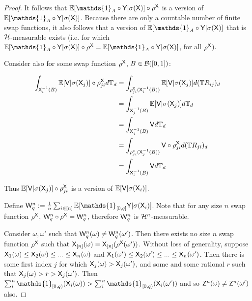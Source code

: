 \begin{proof}
It follows that $\mathbb{E}[\mathds{1}_A\circ\RV{Y}|\sigma(\RV{X})] \circ\rho^{\RV{X}}$ is a version of $\mathbb{E}[\mathds{1}_A\circ\RV{Y}|\sigma(\RV{X})]$. Because there are only a countable number of finite swap functions, it also follows that a version of $\mathbb{E}[\mathds{1}_A\circ\RV{Y}|\sigma(\RV{X})]$ that is $\mathcal{H}$-measurable exists (i.e. for which $\mathbb{E}[\mathds{1}_A\circ\RV{Y}|\sigma(\RV{X})]\circ\rho^{\RV{X}} = \mathbb{E}[\mathds{1}_A\circ\RV{Y}|\sigma(\RV{X})]$, for all $\rho^{\mathsf{X}}$).

Consider also for some swap function $\rho^{\mathsf{X}}$, $B\in \mathcal{B}([0,1])$:

\begin{align}
    \int_{\mathsf{X}_i^{-1}(B)} \mathbb{E}[\mathsf{V}|\sigma(\mathsf{X}_j)] \circ \rho^{\mathsf{X}}_{ji} d\mathbb{T}_d &= \int_{\rho^{\mathsf{X}}_{ji}(\mathsf{X}_i^{-1}(B))} \mathbb{E}[\mathsf{V}|\sigma(\mathsf{X}_j)] d(\mathbb{T}R_{ij})_d\\
                                                                               &= \int_{\mathsf{X}^{-1}_{j}(B)} \mathbb{E}[\mathsf{V}|\sigma(\mathsf{X}_j)] d\mathbb{T}_d\\
                                                                               &= \int_{\mathsf{X}_j^{-1}(B)} \mathsf{V} d\mathbb{T}_d\\
                                                                               &= \int_{\rho_{ji}^*(\mathsf{X}_j^{-1}(B))}\mathsf{V}\circ \rho^{\mathsf{X}}_{ji} d(\mathbb{T}R_{ji})_d\\
                                                                               &= \int_{\mathsf{X}_i^{-1}(B)} \mathsf{V}d\mathbb{T}_d
\end{align}

Thus $\mathbb{E}[\mathsf{V}|\sigma(\mathsf{X}_j)]\circ\rho^{\mathsf{X}}_{ji}$ is a version of $\mathbb{E}[\mathsf{V}|\sigma({\mathsf{X}_i})]$.

Define $\RV{W}^n_q := \frac{1}{n}\sum_{i\in [n]} \mathbb{E}[\mathds{1}_{[0,q]}\RV{Y}|\sigma(\RV{X}_i)]$. Note that for any size $n$ swap function $\rho^{\mathsf{X}}$, $\mathsf{W}^n_q\circ\rho^{\mathsf{X}}=\mathsf{W}_q^n$, therefore $\mathsf{W}_q^n$ is $\mathcal{H}^n$-measurable. 

Consider $\omega,\omega'$ such that $\mathsf{W}_q^n(\omega)\neq \mathsf{W}_q^n(\omega')$. Then there exists no size $n$ swap function $\rho^{\mathsf{X}}$ such that $\mathsf{X}_{[n]}(\omega)=\mathsf{X}_{[n]}(\rho^{\mathsf{X}}(\omega'))$. Without loss of generality, suppose $\mathsf{X}_1(\omega)\leq\mathsf{X}_2(\omega)\leq...\leq\mathsf{X}_n(\omega)$ and $\mathsf{X}_1(\omega')\leq\mathsf{X}_2(\omega')\leq...\leq\mathsf{X}_n(\omega')$. Then there is some first index $j$ for which $\mathsf{X}_{j}(\omega)> \mathsf{X}_{j}(\omega')$, and some and some rational $r$ such that $\mathsf{X}_j(\omega)>r>\mathsf{X}_j(\omega')$. Then $\sum_{i}^n \mathds{1}_{[0,q)}(\RV{X}_i(\omega)) > \sum_i^n \mathds{1}_{[0,q)}(\RV{X}_i(\omega'))$ and so $\mathsf{Z}^n(\omega)\neq\mathsf{Z}^n(\omega')$ also.


\end{proof}
